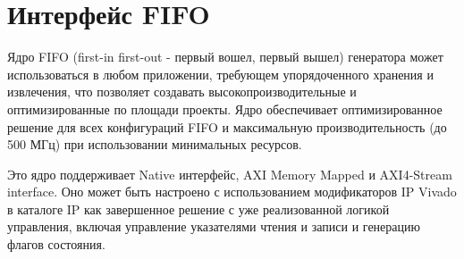 



\section{Интерфейс FIFO}

Ядро FIFO (first-in first-out - первый вошел, первый вышел) генератора может использоваться в любом приложении, требующем упорядоченного
хранения и извлечения, что позволяет создавать высокопроизводительные и оптимизированные по площади проекты.
Ядро обеспечивает оптимизированное решение для всех конфигураций FIFO и  максимальную производительность (до 500 МГц) при использовании
минимальных ресурсов.

Это ядро поддерживает Native интерфейс, AXI Memory Mapped и AXI4-Stream interface.
Оно может быть настроено с использованием модификаторов IP Vivado в каталоге
IP как завершенное решение с уже реализованной логикой управления, включая управление указателями
чтения и записи и генерацию флагов состояния.

